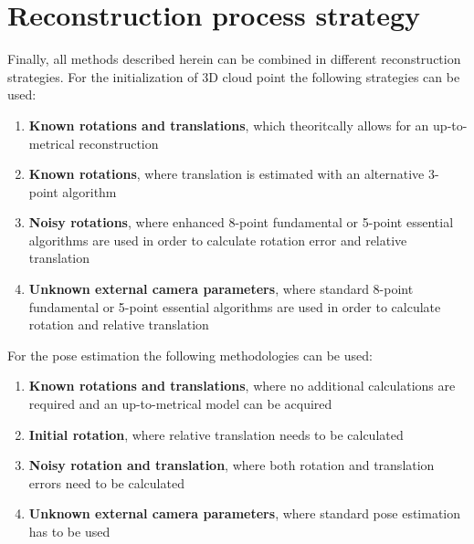 \section{Reconstruction process strategy}
Finally, all methods described herein can be combined in different reconstruction strategies. For the initialization of 3D cloud point the following strategies can be used: 
\begin{enumerate} 
\item \textbf{Known rotations and translations}, which theoritcally allows for an up-to-metrical reconstruction
\item \textbf{Known rotations}, where translation is estimated with an alternative 3-point algorithm
\item \textbf{Noisy rotations}, where enhanced 8-point fundamental or 5-point essential algorithms are used in order to calculate rotation error and relative translation 
\item \textbf{Unknown external camera parameters}, where standard 8-point fundamental or 5-point essential algorithms are used in order to calculate rotation and relative translation
\end{enumerate}
For the pose estimation the following methodologies can be used:
\begin{enumerate}
\item \textbf{Known rotations and translations}, where no additional calculations are required and an up-to-metrical model can be acquired
\item \textbf{Initial rotation}, where relative translation needs to be calculated
\item \textbf{Noisy rotation and translation}, where both rotation and translation errors need to be calculated
\item \textbf{Unknown external camera parameters}, where standard pose estimation has to be used
\end{enumerate}



